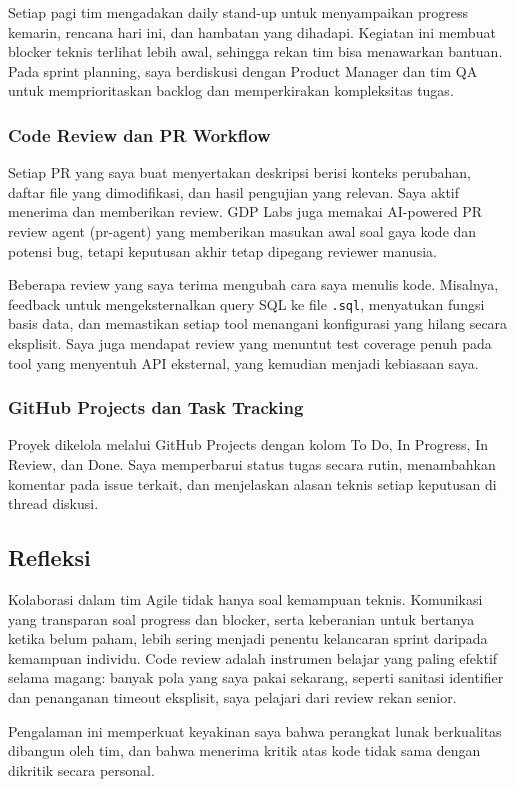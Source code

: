 Setiap pagi tim mengadakan daily stand-up untuk menyampaikan progress kemarin, rencana hari ini, dan hambatan yang dihadapi. Kegiatan ini membuat blocker teknis terlihat lebih awal, sehingga rekan tim bisa menawarkan bantuan. Pada sprint planning, saya berdiskusi dengan Product Manager dan tim QA untuk memprioritaskan backlog dan memperkirakan kompleksitas tugas.

\subsubsection{Code Review dan PR Workflow}

Setiap PR yang saya buat menyertakan deskripsi berisi konteks perubahan, daftar file yang dimodifikasi, dan hasil pengujian yang relevan. Saya aktif menerima dan memberikan review. GDP Labs juga memakai AI-powered PR review agent (pr-agent) yang memberikan masukan awal soal gaya kode dan potensi bug, tetapi keputusan akhir tetap dipegang reviewer manusia.

Beberapa review yang saya terima mengubah cara saya menulis kode. Misalnya, feedback untuk mengeksternalkan query SQL ke file \texttt{.sql}, menyatukan fungsi basis data, dan memastikan setiap tool menangani konfigurasi yang hilang secara eksplisit. Saya juga mendapat review yang menuntut test coverage penuh pada tool yang menyentuh API eksternal, yang kemudian menjadi kebiasaan saya.

\subsubsection{GitHub Projects dan Task Tracking}

Proyek dikelola melalui GitHub Projects dengan kolom To Do, In Progress, In Review, dan Done. Saya memperbarui status tugas secara rutin, menambahkan komentar pada issue terkait, dan menjelaskan alasan teknis setiap keputusan di thread diskusi.

\subsection{Refleksi}

Kolaborasi dalam tim Agile tidak hanya soal kemampuan teknis. Komunikasi yang transparan soal progress dan blocker, serta keberanian untuk bertanya ketika belum paham, lebih sering menjadi penentu kelancaran sprint daripada kemampuan individu. Code review adalah instrumen belajar yang paling efektif selama magang: banyak pola yang saya pakai sekarang, seperti sanitasi identifier dan penanganan timeout eksplisit, saya pelajari dari review rekan senior.

Pengalaman ini memperkuat keyakinan saya bahwa perangkat lunak berkualitas dibangun oleh tim, dan bahwa menerima kritik atas kode tidak sama dengan dikritik secara personal.

\clearpage

